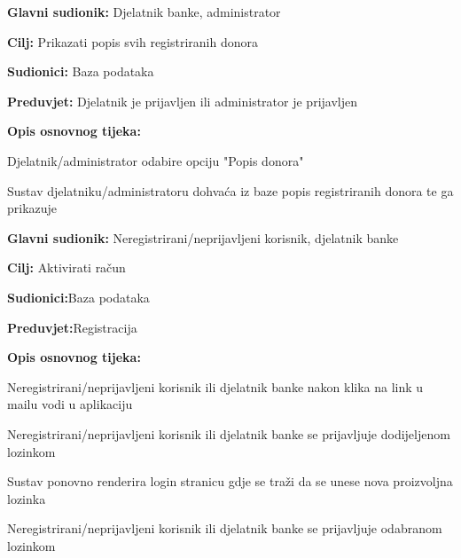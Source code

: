 \noindent {}
					\begin{packed_item}
	
						\item \textbf{Glavni sudionik: }Djelatnik banke, administrator
						\item \textbf{Cilj:} Prikazati popis svih registriranih donora
						\item \textbf{Sudionici:} Baza podataka
						\item \textbf{Preduvjet:} Djelatnik je prijavljen ili administrator je prijavljen
						\item \textbf{Opis osnovnog tijeka:}
						
						\item[] \begin{packed_enum}
	
							\item Djelatnik/administrator odabire opciju "Popis donora"
							\item Sustav djelatniku/administratoru dohvaća iz baze popis registriranih donora te ga prikazuje
						\end{packed_enum}

					\end{packed_item}



\noindent {}
\begin{packed_item}
	
	\item \textbf{Glavni sudionik: } {Neregistrirani/neprijavljeni korisnik, djelatnik banke}
	\item  \textbf{Cilj:} {Aktivirati račun}
	\item  \textbf{Sudionici:}{Baza podataka} 
	\item  \textbf{Preduvjet:}{Registracija}
	\item  \textbf{Opis osnovnog tijeka:}
	
	\item[] \begin{packed_enum}
		
		\item {Neregistrirani/neprijavljeni korisnik ili  djelatnik banke nakon klika na link u mailu vodi u aplikaciju}
		\item {Neregistrirani/neprijavljeni korisnik ili  djelatnik banke se prijavljuje dodijeljenom lozinkom}
		\item {Sustav ponovno renderira login stranicu gdje se traži da se unese nova proizvoljna lozinka} 
		\item {Neregistrirani/neprijavljeni korisnik ili  djelatnik banke se prijavljuje odabranom lozinkom}
	\end{packed_enum}
	
\end{packed_item}
\eject

